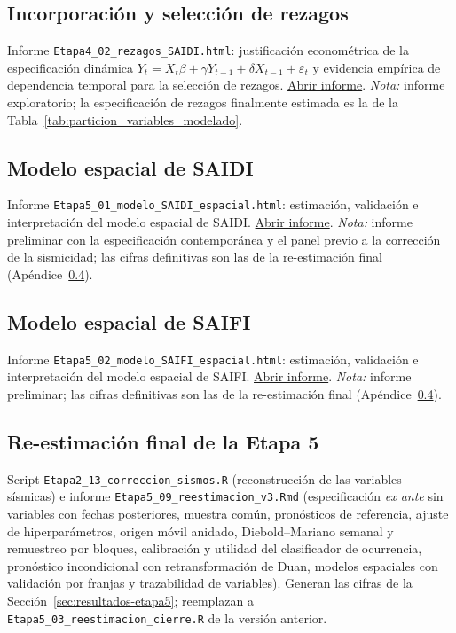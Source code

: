 \subsection{Incorporación y selección de rezagos}
\label{app:html-etapa4-02}
Informe \texttt{Etapa4\_02\_rezagos\_SAIDI.html}: justificación econométrica de la especificación dinámica $Y_t = X_t\beta + \gamma Y_{t-1} + \delta X_{t-1} + \varepsilon_t$ y evidencia empírica de dependencia temporal para la selección de rezagos.
\href{\urlEtapaCuatroDos}{Abrir informe}. \textit{Nota:} informe exploratorio; la especificación de rezagos finalmente estimada es la de la Tabla~\ref{tab:particion_variables_modelado}.

\subsection{Modelo espacial de SAIDI}
\label{app:html-etapa5-01}
Informe \texttt{Etapa5\_01\_modelo\_SAIDI\_espacial.html}: estimación, validación e interpretación del modelo espacial de SAIDI.
\href{\urlEtapaCincoUno}{Abrir informe}. \textit{Nota:} informe preliminar con la especificación contemporánea y el panel previo a la corrección de la sismicidad; las cifras definitivas son las de la re-estimación final (Apéndice~\ref{app:codigo-cierre}).

\subsection{Modelo espacial de SAIFI}
\label{app:html-etapa5-02}
Informe \texttt{Etapa5\_02\_modelo\_SAIFI\_espacial.html}: estimación, validación e interpretación del modelo espacial de SAIFI.
\href{\urlEtapaCincoDos}{Abrir informe}. \textit{Nota:} informe preliminar; las cifras definitivas son las de la re-estimación final (Apéndice~\ref{app:codigo-cierre}).

\subsection{Re-estimación final de la Etapa 5}
\label{app:codigo-cierre}
Script \texttt{Etapa2\_13\_correccion\_sismos.R} (reconstrucción de las variables sísmicas) e informe \texttt{Etapa5\_09\_reestimacion\_v3.Rmd} (especificación \emph{ex ante} sin variables con fechas posteriores, muestra común, pronósticos de referencia, ajuste de hiperparámetros, origen móvil anidado, Diebold--Mariano semanal y remuestreo por bloques, calibración y utilidad del clasificador de ocurrencia, pronóstico incondicional con retransformación de Duan, modelos espaciales con validación por franjas y trazabilidad de variables). Generan las cifras de la Sección~\ref{sec:resultados-etapa5}; reemplazan a \texttt{Etapa5\_03\_reestimacion\_cierre.R} de la versión anterior.

